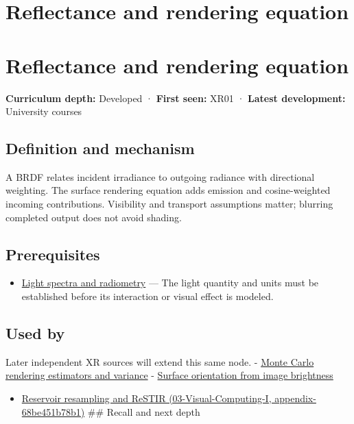 \hypertarget{appendix-96da0b153b77}{}
\section*{Reflectance and rendering equation}
\section{Reflectance and rendering equation}\label{appendix-96da0b153b77-reflectance-and-rendering-equation}

\textbf{Curriculum depth:} Developed · \textbf{First seen:} XR01 · \textbf{Latest development:} University courses

\subsection{Definition and mechanism}\label{appendix-96da0b153b77-definition-and-mechanism}

A BRDF relates incident irradiance to outgoing radiance with directional weighting. The surface rendering equation adds emission and cosine-weighted incoming contributions. Visibility and transport assumptions matter; blurring completed output does not avoid shading.

\subsection{Prerequisites}\label{appendix-96da0b153b77-prerequisites}

\begin{itemize}
\tightlist
\item
  \hyperref[appendix-215c2570199b]{Light spectra and radiometry} --- The light quantity and units must be established before its interaction or visual effect is modeled.
\end{itemize}

\subsection{Used by}\label{appendix-96da0b153b77-used-by}

Later independent XR sources will extend this same node. - \hyperref[appendix-031e02bf28af]{Monte Carlo rendering estimators and variance} - \hyperref[appendix-89b2d5b7c9e1]{Surface orientation from image brightness}

\begin{itemize}
\tightlist
\item
  \href{../03-Visual-Computing-I/main.pdf\#nameddest=appendix-68be451b78b1}{Reservoir resampling and ReSTIR (03-Visual-Computing-I, appendix-68be451b78b1)} \#\# Recall and next depth
\end{itemize}

